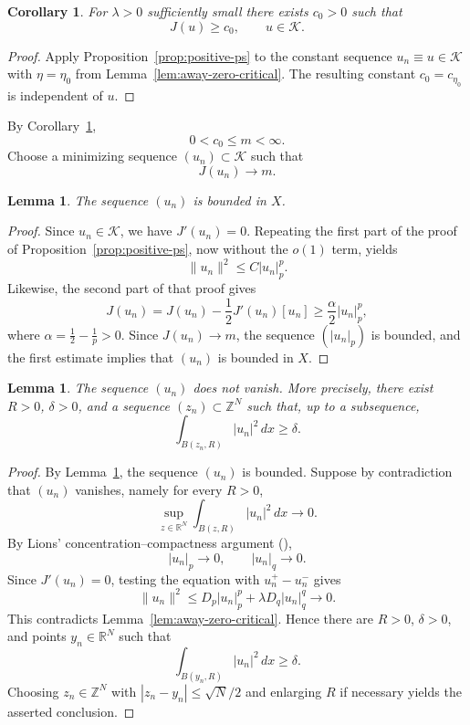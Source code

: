 \documentclass[10pt,a4paper]{amsart}
\numberwithin{equation}{section}
\newtheorem{lemma}[theorem]{Lemma}
\newtheorem{corollary}[theorem]{Corollary}
\newcommand{\R}{\mathbb{R}}
\newcommand{\Z}{\mathbb{Z}}
\newcommand{\cK}{\mathcal{K}}
\begin{document}
\begin{corollary}\label{cor:critical-positive}
For $\lambda>0$ sufficiently small there exists $c_0>0$ such that
\[
J(u)\ge c_0,
\qquad u\in\cK.
\]
\end{corollary}

\begin{proof}
Apply Proposition~\ref{prop:positive-ps} to the constant sequence
$u_n\equiv u\in\cK$ with $\eta=\eta_0$ from
Lemma~\ref{lem:away-zero-critical}. The resulting constant
$c_0=c_{\eta_0}$ is independent of $u$.
\end{proof}

By Corollary~\ref{cor:critical-positive},
\[
0<c_0\le m<\infty.
\]
Choose a minimizing sequence $(u_n)\subset\cK$ such that
\[
J(u_n)\to m.
\]

\begin{lemma}\label{lem:min-bounded}
The sequence $(u_n)$ is bounded in $X$.
\end{lemma}

\begin{proof}
Since $u_n\in\cK$, we have $J'(u_n)=0$. Repeating the first part of the
proof of Proposition~\ref{prop:positive-ps}, now without the $o(1)$ term,
yields
\[
\|u_n\|^2\le C|u_n|_p^p.
\]
Likewise, the second part of that proof gives
\[
J(u_n)
=J(u_n)-\frac12J'(u_n)[u_n]
\ge\frac{\alpha}{2}|u_n|_p^p,
\]
where $\alpha=\frac12-\frac1p>0$. Since $J(u_n)\to m$, the sequence
$(|u_n|_p)$ is bounded, and the first estimate implies that $(u_n)$ is
bounded in $X$.
\end{proof}

\begin{lemma}\label{lem:no-vanishing}
The sequence $(u_n)$ does not vanish. More precisely, there exist
$R>0$, $\delta>0$, and a sequence $(z_n)\subset\Z^{N}$ such that, up to
a subsequence,
\[
\int_{B(z_n,R)}|u_n|^2\,dx\ge\delta.
\]
\end{lemma}

\begin{proof}
By Lemma~\ref{lem:min-bounded}, the sequence $(u_n)$ is bounded. Suppose by contradiction that $(u_n)$ vanishes, namely for every $R>0$,
\[
\sup_{z\in\R^{N}}\int_{B(z,R)}|u_n|^2\,dx\to0.
\]
By Lions' concentration--compactness argument (\cite{Lions}),
\[
|u_n|_p\to0,\qquad |u_n|_q\to0.
\]
Since $J'(u_n)=0$, testing the equation with $u_n^+-u_n^-$ gives
\[
\|u_n\|^2
\le D_p|u_n|_p^p+\lambda D_q|u_n|_q^q\to0.
\]
This contradicts Lemma~\ref{lem:away-zero-critical}. Hence there are
$R>0$, $\delta>0$, and points $y_n\in\R^N$ such that
\[
\int_{B(y_n,R)}|u_n|^2\,dx\ge\delta.
\]
Choosing $z_n\in\Z^N$ with $|z_n-y_n|\le \sqrt N/2$ and enlarging $R$
if necessary yields the asserted conclusion.
\end{proof}
\end{document}
